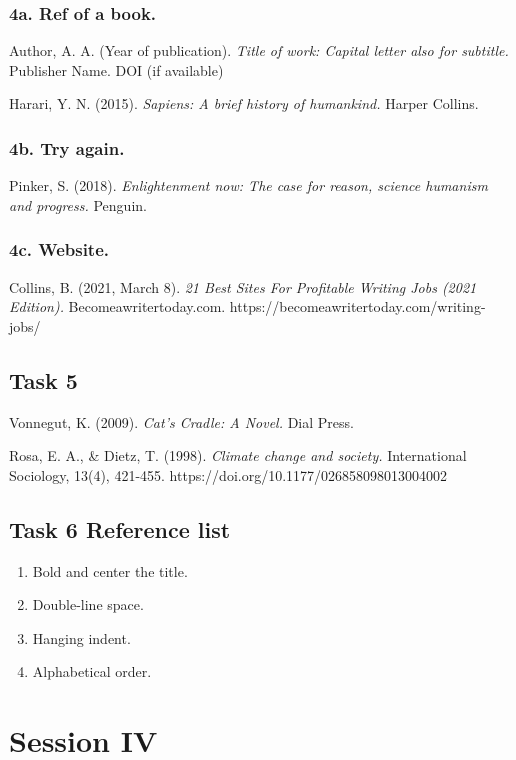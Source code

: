 \documentclass[a4paper]{article}
\begin{document}
\subsubsection{4a. Ref of a book.}

Author, A. A. (Year of publication). \textit{Title of work: Capital letter also for subtitle.} Publisher Name. DOI (if available)

Harari, Y. N. (2015). \textit{Sapiens: A brief history of humankind.} Harper Collins.

\subsubsection{4b. Try again.}

Pinker, S. (2018). \textit{Enlightenment now: The case for reason, science humanism and progress.} Penguin.

\subsubsection{4c. Website.}

Collins, B. (2021, March 8). \textit{21 Best Sites For Profitable Writing Jobs (2021 Edition).} Becomeawritertoday.com. https://becomeawritertoday.com/writing-jobs/

\subsection{Task 5}

Vonnegut, K. (2009). \textit{Cat's Cradle: A Novel.} Dial Press.

Rosa, E. A., \& Dietz, T. (1998). \textit{Climate change and society.} International Sociology, 13(4), 421-455. https://doi.org/10.1177/026858098013004002

\subsection{Task 6 Reference list}

\begin{enumerate}
    \item Bold and center the title.
    \item Double-line space.
    \item Hanging indent.
    \item Alphabetical order.
\end{enumerate}

\section{Session IV}
\end{document}
